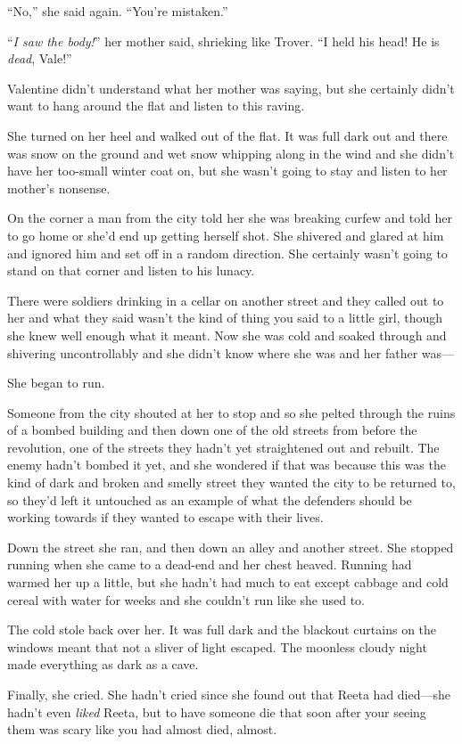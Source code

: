 “No,” she said again. “You’re mistaken.”

“\emph{I saw the body!}” her mother said, shrieking like Trover. “I
held his head! He is \emph{dead}, Vale!”

Valentine didn’t understand what her mother was saying, but she
certainly didn’t want to hang around the flat and listen to this
raving.

She turned on her heel and walked out of the flat. It was full dark
out and there was snow on the ground and wet snow whipping along in
the wind and she didn’t have her too-small winter coat on, but she
wasn’t going to stay and listen to her mother’s nonsense.

On the corner a man from the city told her she was breaking curfew
and told her to go home or she’d end up getting herself shot. She
shivered and glared at him and ignored him and set off in a random
direction. She certainly wasn’t going to stand on that corner and
listen to his lunacy.

There were soldiers drinking in a cellar on another street and they
called out to her and what they said wasn’t the kind of thing you
said to a little girl, though she knew well enough what it meant.
Now she was cold and soaked through and shivering uncontrollably
and she didn’t know where she was and her father was—

She began to run.

Someone from the city shouted at her to stop and so she pelted
through the ruins of a bombed building and then down one of the old
streets from before the revolution, one of the streets they hadn’t
yet straightened out and rebuilt. The enemy hadn’t bombed it yet,
and she wondered if that was because this was the kind of dark and
broken and smelly street they wanted the city to be returned to, so
they’d left it untouched as an example of what the defenders should
be working towards if they wanted to escape with their lives.

Down the street she ran, and then down an alley and another street.
She stopped running when she came to a dead-end and her chest
heaved. Running had warmed her up a little, but she hadn’t had much
to eat except cabbage and cold cereal with water for weeks and she
couldn’t run like she used to.

The cold stole back over her. It was full dark and the blackout
curtains on the windows meant that not a sliver of light escaped.
The moonless cloudy night made everything as dark as a cave.

Finally, she cried. She hadn’t cried since she found out that Reeta
had died—she hadn’t even \emph{liked} Reeta, but to have someone
die that soon after your seeing them was scary like you had almost
died, almost.

